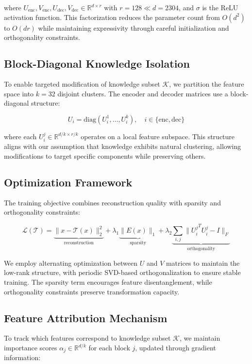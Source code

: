 \documentclass{article} %
\begin{document}
where $U_{\text{enc}}, V_{\text{enc}}, U_{\text{dec}}, V_{\text{dec}} \in \mathbb{R}^{d \times r}$ with $r=128 \ll d=2304$, and $\sigma$ is the ReLU activation function. This factorization reduces the parameter count from $O(d^2)$ to $O(dr)$ while maintaining expressivity through careful initialization and orthogonality constraints.

\subsection{Block-Diagonal Knowledge Isolation}
To enable targeted modification of knowledge subset $\mathcal{K}$, we partition the feature space into $k=32$ disjoint clusters. The encoder and decoder matrices use a block-diagonal structure:

\begin{equation}
    U_i = \text{diag}(U_i^1, \ldots, U_i^k), \quad i \in \{\text{enc}, \text{dec}\}
\end{equation}

where each $U_i^j \in \mathbb{R}^{d/k \times r/k}$ operates on a local feature subspace. This structure aligns with our assumption that knowledge exhibits natural clustering, allowing modifications to target specific components while preserving others.

\subsection{Optimization Framework}
The training objective combines reconstruction quality with sparsity and orthogonality constraints:

\begin{equation}
    \mathcal{L}(\mathcal{T}) = \underbrace{\|x - \mathcal{T}(x)\|_2^2}_{\text{reconstruction}} + \lambda_1 \underbrace{\|E(x)\|_1}_{\text{sparsity}} + \lambda_2 \underbrace{\sum_{i,j} \|{U_i^j}^T U_i^j - I\|_F}_{\text{orthogonality}}
\end{equation}

We employ alternating optimization between $U$ and $V$ matrices to maintain the low-rank structure, with periodic SVD-based orthogonalization to ensure stable training. The sparsity term encourages feature disentanglement, while orthogonality constraints preserve transformation capacity.

\subsection{Feature Attribution Mechanism}
To track which features correspond to knowledge subset $\mathcal{K}$, we maintain importance scores $\alpha_j \in \mathbb{R}^{d/k}$ for each block $j$, updated through gradient information:
\end{document}
